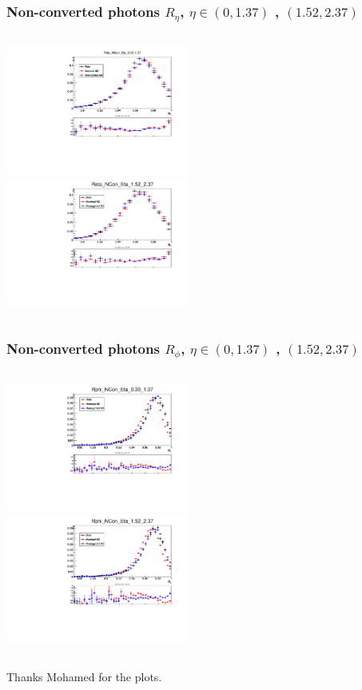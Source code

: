 \documentclass{beamer}
\begin{document}




\begin{frame}
\frametitle{Non-converted photons $R_\eta$, $\eta \in (0, 1.37)$ , $(1.52, 2.37)$}

\begin{columns}[t]
\centering
\includegraphics[width=6cm]{Reta_NConv_0_137.pdf}\\
\centering
\includegraphics[width=6cm]{Reta_NConv_152_237.pdf}\\
\end{columns}
\end{frame}
\begin{frame}
\frametitle{Non-converted photons $R_\phi$, $\eta \in (0, 1.37)$ , $(1.52, 2.37)$}

\begin{columns}[t]
\centering
\includegraphics[width=6cm]{Rphi_NConv_0_137.pdf}\\
\centering
\includegraphics[width=6cm]{Rphi_NConv_152_237.pdf}\\
\end{columns}
Thanks Mohamed for the plots.
\end{frame}
\end{document}
